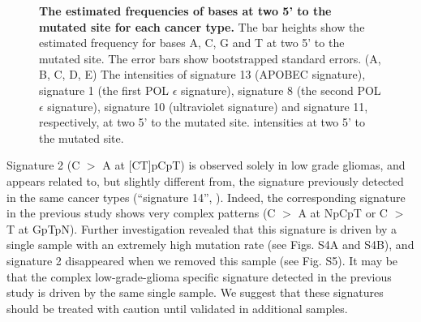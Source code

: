 \documentclass[10pt,letterpaper]{article}
\begin{document}
\begin{figure}[h]
\caption{{\bf The estimated frequencies of bases at two 5' to the mutated site for each cancer type.}
The bar heights show the estimated frequency for bases A, C, G and T at two 5' to the mutated site.
The error bars show bootstrapped standard errors.
(A, B, C, D, E) The intensities of signature 13 (APOBEC signature), signature 1 (the first POL $\epsilon$ signature),
signature 8 (the second POL $\epsilon$ signature), signature 10 (ultraviolet signature) and signature 11, respectively, at two 5' to the mutated site.
intensities at two 5' to the mutated site.
}
\label{two5prime}
\end{figure}


Signature 2 (C $>$ A at [CT]pCpT) is observed solely in low grade gliomas, and
appears related to, but slightly different from, the signature previously detected in the same cancer types (``signature 14'', \cite{pmid23318258}). 
Indeed, the corresponding signature in the previous study shows very complex patterns (C $>$ A at NpCpT or C $>$ T at GpTpN). Further investigation
revealed that this signature is driven by 
a single sample with an extremely high mutation rate (see Figs. S4A and S4B), and signature 2 disappeared when we removed this sample (see Fig. S5).
It may be that the complex low-grade-glioma specific signature detected in the previous study is driven by the same single sample.
We suggest that these signatures should be treated with caution until validated in additional samples. 
 
\end{document}
